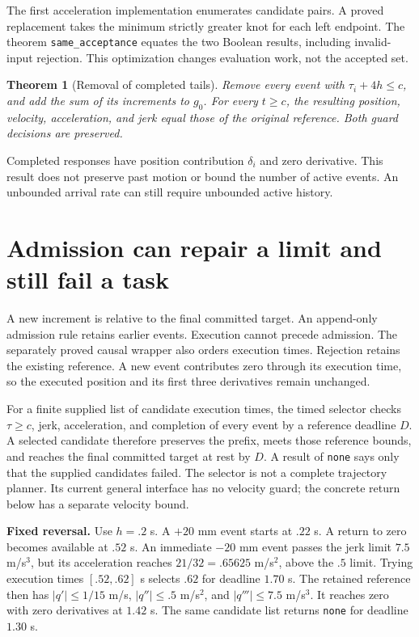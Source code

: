 \documentclass[10pt,letterpaper]{article}
\newtheorem{theorem}{Theorem}
\begin{document}
The first acceleration implementation enumerates candidate pairs. A proved
replacement takes the minimum strictly greater knot for each left endpoint.
The theorem \texttt{same\_acceptance} equates the two Boolean results, including
invalid-input rejection. This optimization changes evaluation work, not the
accepted set.

\begin{theorem}[Removal of completed tails]\label{thm:prune}
Remove every event with $\tau_i+4h\leq c$, and add the sum of its increments to
$g_0$. For every $t\geq c$, the resulting position, velocity, acceleration, and
jerk equal those of the original reference. Both guard decisions are preserved.
\end{theorem}
Completed responses have position contribution $\delta_i$ and zero derivative.
This result does not preserve past motion or bound the number of active events.
An unbounded arrival rate can still require unbounded active history.

\section{Admission can repair a limit and still fail a task}
A new increment is relative to the final committed target. An append-only
admission rule retains earlier events. Execution cannot precede admission.
The separately proved causal wrapper also orders execution times. Rejection
retains the existing reference. A new event contributes zero through its
execution time, so the executed position and its first three derivatives remain
unchanged.

For a finite supplied list of candidate execution times, the timed selector
checks $\tau\geq c$, jerk, acceleration, and completion of every event by a
reference deadline $D$. A selected candidate therefore preserves the prefix,
meets those reference bounds, and reaches the final committed target at rest
by $D$. A result of \texttt{none} says only that the supplied candidates failed.
The selector is not a complete trajectory planner. Its current general
interface has no velocity guard; the concrete return below has a separate
velocity bound.

\textbf{Fixed reversal.} Use $h=.2$ s. A $+20$ mm event starts at $.22$ s.
A return to zero becomes available at $.52$ s. An immediate $-20$ mm event
passes the jerk limit $7.5$ m/s$^3$, but its acceleration reaches
$21/32=.65625$ m/s$^2$, above the $.5$ limit. Trying execution times
$[.52,.62]$ s selects $.62$ for deadline $1.70$ s. The retained reference then
has $|q'|\leq1/15$ m/s, $|q''|\leq.5$ m/s$^2$, and $|q'''|\leq7.5$ m/s$^3$.
It reaches zero with zero derivatives at $1.42$ s. The same candidate list
returns \texttt{none} for deadline $1.30$ s.
\end{document}
